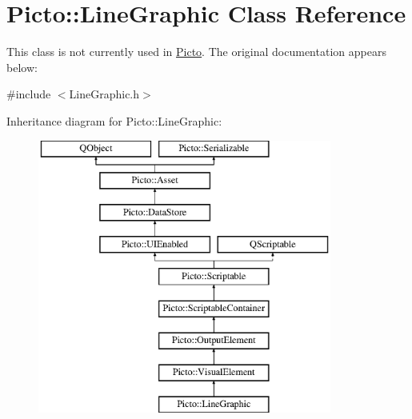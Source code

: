 \hypertarget{class_picto_1_1_line_graphic}{\section{Picto\-:\-:Line\-Graphic Class Reference}
\label{class_picto_1_1_line_graphic}
}


This class is not currently used in \hyperlink{namespace_picto}{Picto}. The original documentation appears below\-:  




{\ttfamily \#include $<$Line\-Graphic.\-h$>$}

Inheritance diagram for Picto\-:\-:Line\-Graphic\-:\begin{figure}[H]
\begin{center}
\leavevmode
\includegraphics[height=9.000000cm]{class_picto_1_1_line_graphic}
\end{center}
\end{figure}
